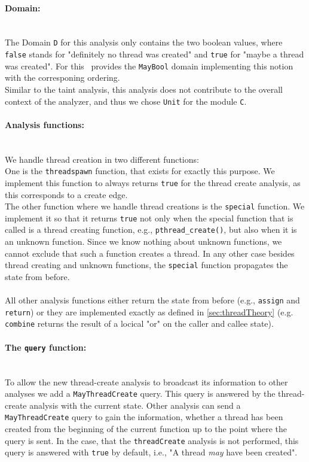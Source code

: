     \paragraph{Domain:}\mbox{}\\
    The Domain \texttt{D} for this analysis only contains the two boolean values, where \texttt{false} stands for "definitely no thread was created" and \texttt{true} for "maybe a thread was created". For this \gob\ provides the \texttt{MayBool} domain implementing this notion with the corresponing ordering.\\
    Similar to the taint analysis, this analysis does not contribute to the overall context of the analyzer, and thus we chose \texttt{Unit} for the module \texttt{C}.

    \paragraph{Analysis functions:}\mbox{}\\ We handle thread creation in two different functions:\\
    One is the \texttt{threadspawn} function, that exists for exactly this purpose. We implement this function to always returns \texttt{true} for the thread create analysis, as this corresponds to a create edge.\\
    The other function where we handle thread creations is the \texttt{special} function. We implement it so that it returns \texttt{true} not only when the special function that is called is a thread creating function, e.g., \texttt{pthread\_create()}, but also when it is an unknown function. Since we know nothing about unknown functions, we cannot exclude that such a function creates a thread. In any other case besides thread creating and unknown functions, the \texttt{special} function propagates the state from before.\\
    \\
    All other analysis functions either return the state from before (e.g., \texttt{assign} and \texttt{return}) or they are implemented exactly as defined in \autoref{sec:threadTheory} (e.g. \texttt{combine} returns the result of a locical "or" on the caller and callee state).

    \paragraph{The \texttt{query} function:}\mbox{}\\
    To allow the new thread-create analysis to broadcast its information to other analyses we add a \texttt{MayThreadCreate} query. This query is answered by the thread-create analysis with the current state. Other analysis can send a \texttt{MayThreadCreate} query to gain the information, whether a thread has been created from the beginning of the current function up to the point where the query is sent. In the case, that the \texttt{threadCreate} analysis is not performed, this query is answered with \texttt{true} by default, i.e., "A thread \textit{may} have been created".\\
    \\
